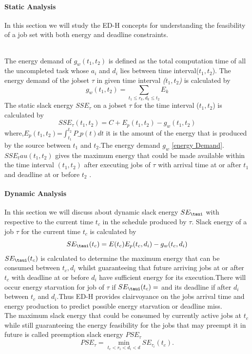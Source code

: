 \documentclass[12pt,hidelinks]{article}
\begin{document}
{\paragraph{Static Analysis}
In this section we will study the ED-H concepts for understanding the feasibility of a job set with both energy and deadline constraints.\newline

\\The energy demand of $g_w(t_1,t_2)$ is defined as the total computation time of all the uncompleted task whose $a_i$ and $d_i$ lies between time interval($t_1,t_2$).
The energy demand of the jobset $\tau$ in given time interval \textit{($t_1,t_2$)} is calculated by 
\begin{equation}\label{energy Demand}
    g_w(t_1,t_2)= \sum_{t_1 \leq r_k,d_k \leq t_2} E_k
\end{equation}
\newline
The static slack energy $SSE_\tau$ on a jobset $\tau$ for the time interval ($t_1,t_2$) is calculated by 
\begin{equation}\label{Static Slack energy}
    SSE_\tau(t_1,t_2)= C+E_p(t_1,t_2)-g_w(t_1,t_2)
\end{equation}
where,$E_p(t_1,t_2)$=$\int_{t_1}^{t_2}P\_p(t)dt$ it is the amount of the energy that is produced by the source between $t_1$ and $t_2$.The energy demand $g_w$ \ref{energy Demand}.$SSE_tau(t_1,t_2)$   gives the maximum energy that could be made available within the  time  interval $(t_1,t_2)$ after executing jobs of $\tau$ with arrival time at or after $t_1$ and deadline at or before $t_2$ \cite{EDH_ex1}. 
\paragraph{Dynamic Analysis}
In this section we will discuss about dynamic slack energy $SE_\taui$ with respective to the current time $t_c$ in the schedule produced by $\tau$.\newline
Slack energy of a job $\tau$ for the current time $t_c$ is calculated by
\begin{equation}\label{Slack energy}
  SE_\taui(t_c)=E(t_c)E_p(t_c,d_i)-g_w(t_c,d_i)
\end{equation}
$SE_\taui(t_c)$ is calculated to determine the maximum energy that can be consumed between $t_c,d_i$ whilst guaranteeing that future arriving jobs at or after $t_c$ with deadline at or before $d_i$ have sufficient energy for its execution.There will occur energy starvation for job of $\tau$ if $SE_\taui(t_c)=$  and its deadline if after $d_i$ between $t_c$ and $d_i$.Thus ED-H provides clairvoyance on the jobs arrival time and energy production to predict possible energy starvation or deadline miss.\newline
\\The maximum slack energy that could be consumed by currently active jobs at $t_c$ while still guaranteeing the energy feasibility for the jobs that may preempt it in future is called preemption slack energy $PSE_\tau$
\begin{equation}\label{premption Slack energy}
    PSE_\tau= \min\limits_{t_c<r_i<d_i<d} SE_\tau_i(t_c).
\end{equation}

}
\end{document}
